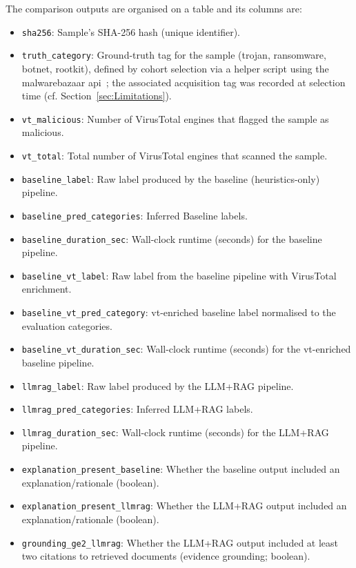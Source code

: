 \vspace{0.5em}
The comparison outputs are organised on a table and its columns are:
\begin{itemize}
      \item \texttt{sha256}: Sample's SHA-256 hash (unique identifier).
      \item \texttt{truth\_category}: Ground-truth tag for the sample (trojan, ransomware, botnet,
            rootkit), defined by cohort selection via a helper script using the \gls{malwarebazaar}
            \gls{api}~\cite{rexisSamplesExtractorScript}; the associated acquisition tag was recorded at selection time (cf. Section~\ref{sec:Limitations}).
      \item \texttt{vt\_malicious}: Number of VirusTotal engines that flagged the sample as malicious.
      \item \texttt{vt\_total}: Total number of VirusTotal engines that scanned the sample.
      \item \texttt{baseline\_label}: Raw label produced by the baseline (heuristics-only) pipeline.
      \item \texttt{baseline\_pred\_categories}: Inferred Baseline labels.
      \item \texttt{baseline\_duration\_sec}: Wall-clock runtime (seconds) for the baseline pipeline.
      \item \texttt{baseline\_vt\_label}: Raw label from the baseline pipeline with VirusTotal enrichment.
      \item \texttt{baseline\_vt\_pred\_category}: \gls{vt}-enriched baseline label normalised to the
            evaluation categories.
      \item \texttt{baseline\_vt\_duration\_sec}: Wall-clock runtime (seconds) for the \gls{vt}-enriched
            baseline pipeline.
      \item \texttt{llmrag\_label}: Raw label produced by the LLM+RAG pipeline.
      \item \texttt{llmrag\_pred\_categories}: Inferred LLM+RAG labels.
      \item \texttt{llmrag\_duration\_sec}: Wall-clock runtime (seconds) for the LLM+RAG pipeline.
      \item \texttt{explanation\_present\_baseline}: Whether the baseline output included an
            explanation/rationale (boolean).
      \item \texttt{explanation\_present\_llmrag}: Whether the LLM+RAG output included an
            explanation/rationale (boolean).
      \item \texttt{grounding\_ge2\_llmrag}: Whether the LLM+RAG output included at least two
            citations to retrieved documents (evidence grounding; boolean).
\end{itemize}

